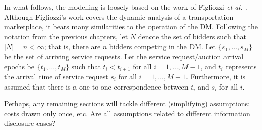 In what follows, the modelling is loosely based on the work of Figliozzi \emph{et al.}~\cite{FigliozziJaillet2008}. Although Figliozzi's work covers the dynamic analysis of a transportation marketplace, it bears many similarities to the operation of the DM. Following the notation from the previous chapters, let $N$ denote the set of bidders such that $|N| = n < \infty$; that is, there are $n$ bidders competing in the DM. Let $\{s_1,\ldots,s_M\}$ be the set of arriving service requests. Let the service request/auction arrival epochs be $\{t_1,\ldots,t_M\}$ such that $t_i < t_{i+1}$ for all $i=1,\ldots,M-1$, and $t_i$ represents the arrival time of service request $s_i$ for all $i=1,\ldots,M-1$. Furthermore, it is assumed that there is a one-to-one correspondence between $t_i$ and $s_i$ for all $i$.

Perhaps, any remaining sections will tackle different (simplifying) assumptions: costs drawn only once, etc. Are all assumptions related to different information disclosure cases?


